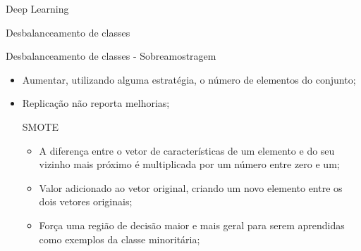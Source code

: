 \documentclass{beamer}
\begin{document}
\begin{frame}{Deep Learning}
\begin{frame}{Desbalanceamento de classes}


\end{frame}
\begin{frame}{Desbalanceamento de classes - Sobreamostragem}
    \begin{itemize}
        \item Aumentar, utilizando alguma estratégia, o número de elementos do conjunto;
        \item Replicação não reporta melhorias;
    \begin{block}{SMOTE}
    \justifying
        \begin{itemize}
            \item A diferença entre o vetor de características de um elemento e do seu vizinho mais próximo é multiplicada por um número entre zero e um;
            \item Valor adicionado ao vetor original, criando um novo elemento entre os dois vetores originais;
            \item Força uma região de decisão maior e mais geral para serem aprendidas como exemplos da classe minoritária;
        \end{itemize}
    \end{block}
    \end{itemize}





\end{frame}
\end{frame}
\end{document}
